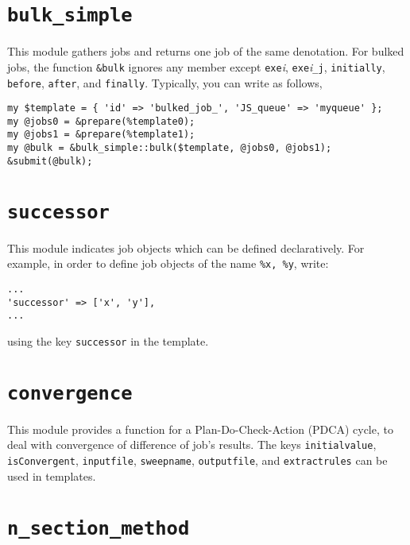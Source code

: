 \documentclass[a4paper,10pt]{report}
\begin{document}
\section{\texttt{bulk\_simple}}

This module gathers jobs and returns one job of the same denotation.
For bulked jobs, the function \texttt{\&bulk} ignores any member
except \texttt{exe}\textit{i},
\texttt{exe}\textit{i}\texttt{\_}\texttt{j}, \texttt{initially},
\texttt{before}, \texttt{after}, and \texttt{finally}.  Typically, you
can write as follows,
\begin{boxnote}
\begin{verbatim}
my $template = { 'id' => 'bulked_job_', 'JS_queue' => 'myqueue' };
my @jobs0 = &prepare(%template0);
my @jobs1 = &prepare(%template1);
my @bulk = &bulk_simple::bulk($template, @jobs0, @jobs1);
&submit(@bulk);
\end{verbatim}
\end{boxnote}

\section{\texttt{successor}}

This module indicates job objects which can be defined declaratively.
For example, in order to define job objects of the name \texttt{\%x,
\%y}, write:
\begin{boxnote}
\begin{verbatim}
...
'successor' => ['x', 'y'],
...
\end{verbatim}
\end{boxnote}
\vspace{\baselineskip}
\noindent
using the key \texttt{successor} in the template.

\section{\texttt{convergence}}

This module provides a function for a Plan-Do-Check-Action (PDCA)
cycle, to deal with convergence of difference of job's results.  The
keys \texttt{initialvalue}, \texttt{isConvergent}, \texttt{inputfile},
\texttt{sweepname}, \texttt{outputfile}, and \texttt{extractrules} can
be used in templates.

\section{\texttt{n\_section\_method}}
\end{document}
